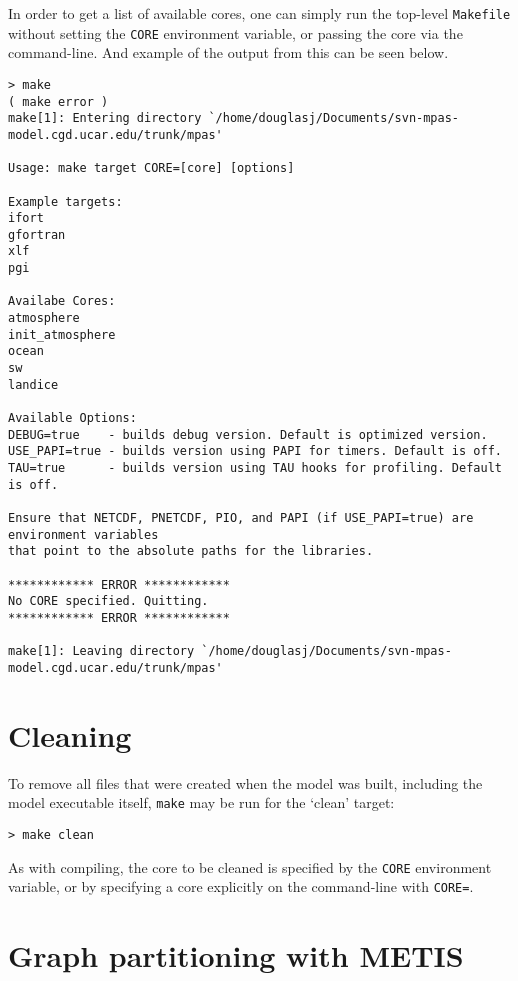 In order to get a list of available cores, one can simply run the top-level {\tt Makefile} without setting the {\tt CORE} environment variable, or passing the core via the command-line. And example of the output from this can be seen below.

{\small
\begin{verbatim}
> make
( make error )
make[1]: Entering directory `/home/douglasj/Documents/svn-mpas-model.cgd.ucar.edu/trunk/mpas'

Usage: make target CORE=[core] [options]

Example targets:
ifort
gfortran
xlf
pgi

Availabe Cores:
atmosphere
init_atmosphere
ocean
sw
landice

Available Options:
DEBUG=true    - builds debug version. Default is optimized version.
USE_PAPI=true - builds version using PAPI for timers. Default is off.
TAU=true      - builds version using TAU hooks for profiling. Default is off.

Ensure that NETCDF, PNETCDF, PIO, and PAPI (if USE_PAPI=true) are environment variables
that point to the absolute paths for the libraries.

************ ERROR ************
No CORE specified. Quitting.
************ ERROR ************

make[1]: Leaving directory `/home/douglasj/Documents/svn-mpas-model.cgd.ucar.edu/trunk/mpas'
\end{verbatim}
}

\section{Cleaning}

To remove all files  that were created when the model was built, including the model executable itself, {\tt make} may
be run for the `clean' target:

\vspace{12pt}
{\tt > make clean}
\vspace{12pt}

As with compiling, the core to be cleaned is specified by the {\tt CORE} environment variable, or by specifying a core explicitly on the command-line with {\tt CORE=}.


\section{Graph partitioning with METIS} 
\label{sec:metis}


